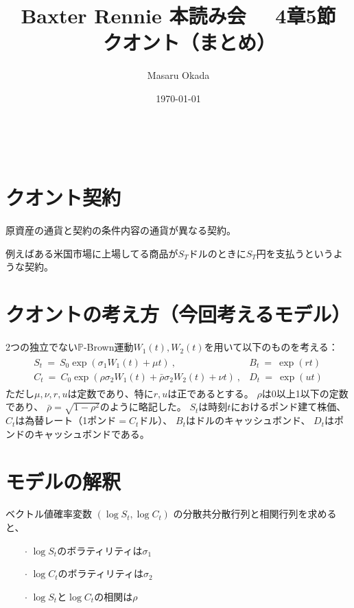 \documentclass[uplatex,a4j,12pt,dvipdfmx]{jsarticle}
\title{
Baxter Rennie 本読み会 \ \ 4章5節 \ \ クオント（まとめ）
}
\author{Masaru Okada}
\date{\today}
\begin{document}
\maketitle

\tableofcontents

\ \\
\section{クオント契約}

原資産の通貨と契約の条件内容の通貨が異なる契約。

例えばある米国市場に上場してる商品が$S_{T}$ドルのときに$S_{T}$円を支払うというような契約。

\section{クオントの考え方（今回考えるモデル）}

2つの独立でない$\mathbb{P}$-Brown運動$W_{1}(t), W_{2}(t)$を用いて以下のものを考える：
%
%
\begin{eqnarray}
	\left.
	\begin{array}{ll}
		S_{t}
		\ = \
		S_{0}
		\exp \left( \sigma_{1} W_{1}(t) + \mu t \right) \ ,
		 &
		B_{t}
		\ = \
		\exp (rt)
		\\
		C_{t}
		\ = \
		C_{0}
		\exp \left(
		\rho \sigma_{2} W_{1}(t) +
		\bar{\rho} \sigma_{2} W_{2}(t) + \nu t \right)\ ,
		 &
		D_{t}
		\ = \
		\exp (ut)
	\end{array}
	\right.
\end{eqnarray}
%
%
ただし$\mu,\nu,r,u$は定数であり、特に$r,u$は正であるとする。
$\rho$は0以上1以下の定数であり、
$\bar{\rho} = \sqrt{1 - \rho^{2}}$のように略記した。
$S_{t}$は時刻$t$におけるポンド建て株価、
$C_{t}$は為替レート（1ポンド$=C_{t}$ドル）、
$B_{t}$はドルのキャッシュボンド、
$D_{t}$はポンドのキャッシュボンドである。

\section{モデルの解釈}

ベクトル値確率変数
$( \log S_{t} , \log C_{t})$
の分散共分散行列と相関行列を求めると、

\ \ \ \ $\cdot$ $\log S_{t}$のボラティリティは$\sigma_{1}$

\ \ \ \ $\cdot$ $\log C_{t}$のボラティリティは$\sigma_{2}$

\ \ \ \ $\cdot$ $\log S_{t}$と$\log C_{t}$の相関は$\rho$
\end{document}
